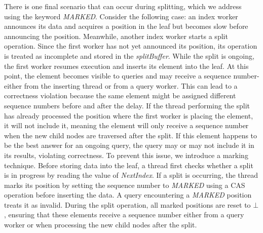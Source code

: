 \documentclass[a4paper,11pt,twoside,openany]{book}
\begin{document}
There is one final scenario that can occur during splitting, which we address
using the keyword \textit{MARKED}. Consider the following case: an index worker
announces its data and acquires a position in the leaf but becomes slow before
announcing the position. Meanwhile, another index worker starts a split operation.
Since the first worker has not yet announced its position, its operation is treated
as incomplete and stored in the \textit{splitBuffer}.  
%
While the split is ongoing, the first worker resumes execution and inserts its element
into the leaf. At this point, the element becomes visible to queries and may receive
a sequence number-either from the inserting thread or from a query worker. This can
lead to a correctness violation because the same element might be assigned different
sequence numbers before and after the delay. If the thread performing the split has
already processed the position where the first worker is placing the element,
it will not include it, meaning the element will only receive a sequence number
when the new child nodes are traversed after the split. If this element happens
to be the best answer for an ongoing query, the query may or may not include it in
its results, violating correctness.  
%
To prevent this issue, we introduce a marking technique. Before storing data into 
the leaf, a thread first checks whether a split is in progress by reading the value
of \textit{NextIndex}. If a split is occurring, the thread marks its position
by setting the sequence number to \textit{MARKED} using a CAS operation before
inserting the data. A query encountering a \textit{MARKED} position treats it as 
invalid. During the split operation, all marked positions are reset to \( \bot \), 
ensuring that these elements receive a sequence number either from a query worker
or when processing the new child nodes after the split.









\cleardoublepage
{}

\end{document}
